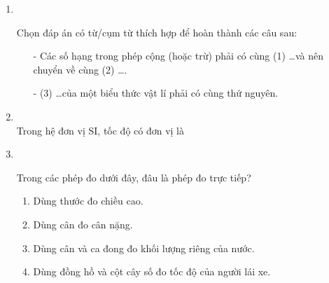 \begin{enumerate}[label=\bfseries Câu \arabic*:,leftmargin=1.5cm]
\item {}\\
{Chọn đáp án có từ/cụm từ thích hợp để hoàn thành các câu sau:
	\begin{itemize}
		\item[-] Các số hạng trong phép cộng (hoặc trừ) phải có cùng (1) \dots và nên chuyển về cùng (2) \dots.
		\item[-] (3) \dots của một biểu thức vật lí phải có cùng thứ nguyên.
	\end{itemize}
}

\item {}\\
Trong hệ đơn vị SI, tốc độ có đơn vị là


\item {}\\
{Trong các phép đo dưới đây, đâu là phép đo trực tiếp?
	\begin{enumerate}[label=(\arabic*)]
		\item Dùng thước đo chiều cao.
		\item Dùng cân đo cân nặng.
		\item Dùng cân và ca đong đo khối lượng riêng của nước.
		\item Dùng đồng hồ và cột cây số đo tốc độ của người lái xe.
	\end{enumerate}
}


\end{enumerate}
